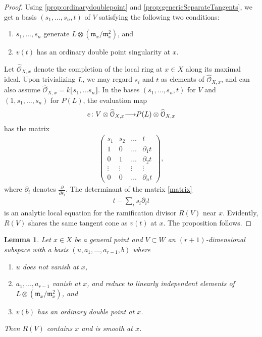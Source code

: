\documentclass[11pt,reqno]{amsart}
\theoremstyle{plain}
\newtheorem{lemma}[theorem]{Lemma}
\theoremstyle{definition}
\theoremstyle{remark}
\numberwithin{equation}{section}
\renewcommand{\to}{{\longrightarrow}}
\numberwithin{equation}{section}
\renewcommand{\O}{\mathcal O}
\begin{document}
\begin{proof}
  Using \autoref{prop:ordinarydoublepoint} and \autoref{prop:genericSeparateTangents}, we get a basis $(s_{1}, ..., s_{n}, t)$ of $V$ satisfying the following two conditions:
  \begin{enumerate}
      \item $s_{1}, \dots, s_{n}$ generate $L \otimes ({\mathfrak m}_{x}/{\mathfrak m}^{2}_{x})$, and
      \item $v(t)$ has an ordinary double point singularity at $x$.
    \end{enumerate}  

    Let $\widehat{\O}_{X,x}$ denote the completion of the local ring at $x \in X$ along its maximal ideal.  Upon trivializing $L$, we may regard $s_{i}$ and $t$ as elements of $\widehat{\O}_{X,x}$, and can also assume  $\widehat{\O}_{X,x} = k\llbracket s_{1}, \dots s_{n}\rrbracket$.
    In the bases $(s_1, \dots, s_n, t)$ for $V$ and $(1, s_1, \dots, s_n)$ for $P(L)$, the evaluation map 
\begin{align*}
  e\from V \otimes \widehat{\O}_{X,x} \to P(L) \otimes \widehat{\O}_{X,x}
\end{align*}
has the matrix
\begin{align}\label{matrix}
\begin{pmatrix}
  s_{1} & s_{2} & \dots & t \\
  1 & 0 & \dots & \partial_{1}t \\
  0 & 1 & \dots & \partial_{2}t \\
  \vdots & \vdots & \vdots & \vdots \\
  0 & 0 & \dots & \partial_{n}t
\end{pmatrix},
\end{align}
where $\partial_{i}$ denotes $\frac{\partial}{\partial s_{i}}$.
The determinant of the matrix \eqref{matrix}
\begin{align*}
  t - \sum_{i}s_{i}\partial_{i}t
\end{align*}
is an analytic local equation for the ramification divisor $R(V)$ near $x$.
Evidently, $R(V)$ shares the same tangent cone as $v(t)$ at $x$.
The proposition follows.
\end{proof}

\begin{lemma}\label{lemma:basepointfree}
  Let $x \in X$ be a general point and $V \subset W$ an $(r+1)$-dimensional subspace with a basis $(u, a_1,\dots, a_{r-1},b)$ where
  \begin{enumerate}
    \item $u$ does not vanish at $x$,
    \item $a_1, \dots , a_{r-1}$ vanish at $x$, and reduce to linearly independent elements of $L \otimes ({\mathfrak m}_{x}/{\mathfrak m}^{2}_{x})$, and
    \item $v(b)$ has an ordinary double point at $x$. 
  \end{enumerate}
  Then $R(V)$ contains $x$ and is smooth at $x$.
\end{lemma}
\end{document}
